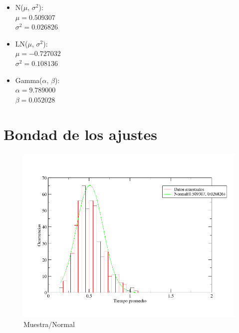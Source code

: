 \documentclass[10pt,a4paper]{article}
\begin{document}
\begin{itemize}
  \item N($\mu$, $\sigma^{2}$): \\
    $\mu = 0.509307$ \\
    $\sigma^{2} = 0.026826$
  \item LN($\mu$, $\sigma^{2}$): \\
    $\mu = -0.727032$ \\
    $\sigma^{2} = 0.108136$
  \item Gamma($\alpha$, $\beta$): \\
    $\alpha = 9.789000$ \\
    $\beta = 0.052028$
\end{itemize}

\section{Bondad de los ajustes}

\begin{figure}
  \centering
  \includegraphics[scale=0.5]{freq-normal.png} 
  \caption{Muestra/Normal}
  \label{freq-normal}
\end{figure}
\end{document}

